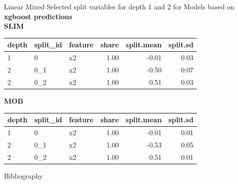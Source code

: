 \documentclass[9pt, xcolor=table]{beamer}
\begin{document}
\begin{frame}{Linear Mixed}
Selected split variables for depth 1 and 2 for Models based on \textbf{xgboost predictions}\\
\textbf{SLIM}

\begin{table}[ht]
\centering
\begin{tabular}{lllrrr}
  \hline
depth & split\_id & feature & share & split.mean & split.sd \\ 
  \hline
1 & 0 & x2 & 1.00 & -0.01 & 0.03 \\ 
  2 & 0\_1 & x2 & 1.00 & -0.50 & 0.07 \\ 
  2 & 0\_2 & x2 & 1.00 & 0.51 & 0.03 \\ 
   \hline
\end{tabular}
\end{table}

\textbf{MOB}
\begin{table}[ht]
\centering
\begin{tabular}{lllrrr}
  \hline
depth & split\_id & feature & share & split.mean & split.sd \\ 
  \hline
1 & 0 & x2 & 1.00 & -0.01 & 0.01 \\ 
  2 & 0\_1 & x2 & 1.00 & -0.53 & 0.05 \\ 
  2 & 0\_2 & x2 & 1.00 & 0.51 & 0.01 \\ 
   \hline
\end{tabular}
\end{table}
\end{frame}


\begin{frame}{Bibliography}
    
    

\end{frame}
\end{document}
